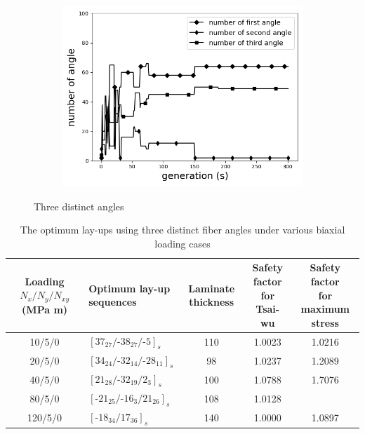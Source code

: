 \begin{figure}[!t]
		\begin{subfigure}[b]{0.8\linewidth}
			\includegraphics[width=\linewidth]{2020-11-10-pre-image/three_distinct_angle_number_of_angle.png}
		\end{subfigure}
	\caption{Three distinct angles}
	\label{fig:three_angles}
\end{figure}


\begin{table}
\normalsize
\caption{The optimum lay-ups using three distinct fiber angles under various biaxial loading cases}
\label{T300/5308 material properties}
\centering
\begin{tabular}{clccc}
	\toprule
	\textbf{Loading} $N_{x}/N_{y}/N_{xy}$ \textbf{(MPa m)}   &
	\makecell{\textbf{Optimum lay-up } \\ \textbf{sequences}  }                        &
	\textbf{Laminate thickness} &  \makecell{\textbf{Safety factor } \\
	\textbf{for Tsai-wu}}  &
	\makecell{\textbf{Safety factor } \\ \textbf{for  maximum stress}}
	 \\
	\midrule
	10/5/0                       &  $[37_{27}/\text{-}38_{27}/\text{-}5]_s$            &     110      &  1.0023 & 1.0216\\
	20/5/0                       &  $[34_{24}/\text{-}32_{14}/\text{-}28_{11}]_s$      &     98       &  1.0237 & 1.2089 \\
	40/5/0                       &  $[21_{28}/\text{-}32_{19}/2_3]_s$                  &     100      &  1.0788 & 1.7076\\
	80/5/0                       &  $[\text{-}21_{25}/\text{-}16_{3}/21_{26}]_s$       &     108      &  1.0128 & \\
	120/5/0                      &  $[\text{-}18_{34}/17_{36}]_s$                      &     140      &  1.0000 & 1.0897\\
	\bottomrule
\end{tabular}
\end{table}

